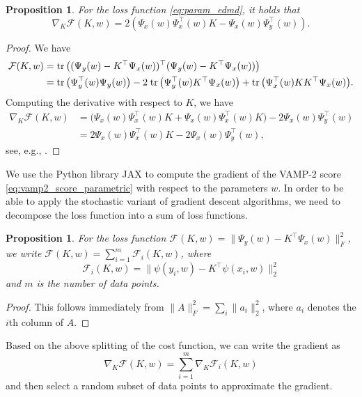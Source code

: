 \documentclass
[
    a4paper,
    DIV=11,
    abstract=true,
    11pt,
]
{scrartcl}
\newcommand{\ts}{\hspace*{0.1em}}                                %
\DeclareMathOperator{\tr}{tr}
\newtheorem{proposition}[theorem]{Proposition}
\theoremstyle{definition}
\begin{document}
\begin{proposition}
For the loss function \eqref{eq:param_edmd}, it holds that $$\nabla_K \mathcal{F}(K, w) = 2(\Psi_x(w) \Psi_x^{\top}(w) K - \Psi_x(w) \Psi_y^{\top}(w)).$$
\end{proposition}
\begin{proof} We have
\begin{align*}
\mathcal{F}(K, w) &= \tr\big(( \Psi_y(w) - K^{\top}\Psi_x(w))^{\top}( \Psi_y(w) - K^{\top}\Psi_x(w) )\big) \\
&= \tr\big(\Psi_y^{\top}(w) \Psi_y(w) \big) - 2 \ts \tr \big(\Psi_y^{\top}(w) K^{\top}\Psi_x(w) \big)  + \tr\big( \Psi_x^{\top}(w) K K^{\top} \Psi_x(w)\big).
\end{align*}
Computing the derivative with respect to $K$, we have
\begin{align*}
\nabla_K \mathcal{F}(K, w) &= \big(\Psi_x(w) \Psi_x^{\top}(w) K  + \Psi_x(w) \Psi_x^{\top}(w) K \big) - 2\Psi_x(w)\Psi_y^{\top}(w) \\
&= 2 \Psi_x(w) \Psi_x^{\top}(w) K - 2\Psi_x(w) \Psi_y^{\top}(w),
\end{align*}
see, e.g., \cite{petersen2008matrix}.
\end{proof}

We use the Python library JAX \cite{jax2018github} to compute the gradient of the VAMP-2 score \eqref{eq:vamp2_score_parametric} with respect to the parameters $w$. In order to be able to apply the stochastic variant of gradient descent algorithms, we need to decompose the loss function into a sum of loss functions.

\begin{proposition}
For the loss function $\mathcal{F}(K, w) = \big \| \Psi_y(w) - K^{\top}\Psi_x(w) \big \|_F^2$, we write $\mathcal{F}(K, w) = \sum_{i=1}^m \mathcal{F}_i(K, w)$, where
\begin{equation*}
    \mathcal{F}_i(K, w) = \big \|\psi(y_i, w) - K^{\top} \psi(x_i, w)\big \|_2^2
\end{equation*}
and $m$ is the number of data points.
\end{proposition}
\begin{proof}
This follows immediately from $\|A\|_F^2 = \sum_i \|a_i\|_2^2$, where $a_i$ denotes the $i$th column of $A$.
\end{proof}
Based on the above splitting of the cost function, we can write the gradient as
\begin{equation*}
    \nabla_K \mathcal{F}(K, w) = \sum_{i=1}^m \nabla_K \mathcal{F}_i(K, w)
\end{equation*}
and then select a random subset of data points to approximate the gradient.
\end{document}
